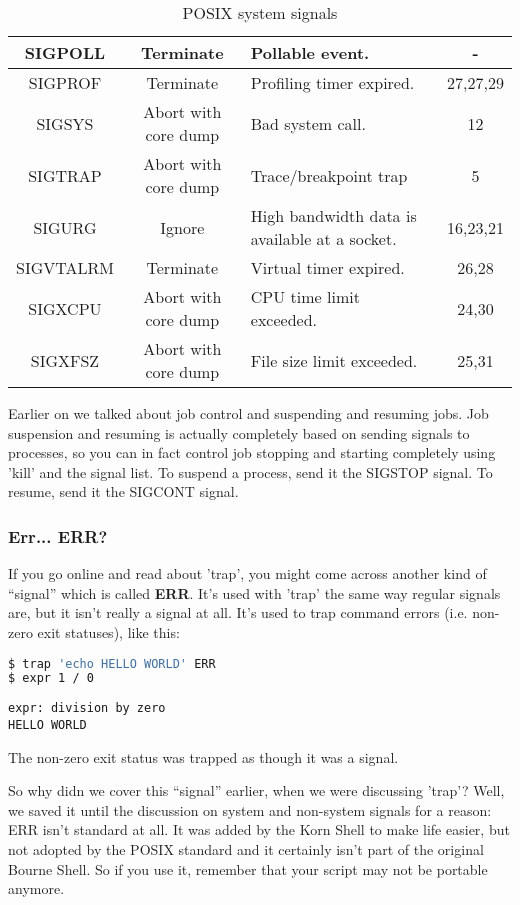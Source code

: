 \begin{table*}[H]
\begin{tabular}{|c|c|p{4cm}|c|}
		 SIGPOLL &  Terminate &  Pollable event. &  - \\ \hline
		 SIGPROF &  Terminate &  Profiling timer expired. &  27,27,29 \\ \hline
		 SIGSYS &  Abort with core dump &  Bad system call. &  12 \\ \hline
		 SIGTRAP &  Abort with core dump &  Trace/breakpoint trap &  5 \\ \hline
		 SIGURG &  Ignore &  High bandwidth data is available at a socket. &  16,23,21 \\ \hline
		 SIGVTALRM &  Terminate &  Virtual timer expired. &  26,28 \\ \hline
		 SIGXCPU &  Abort with core dump &  CPU time limit exceeded. &  24,30 \\ \hline
		 SIGXFSZ &  Abort with core dump &  File size limit exceeded. &  25,31 \\ \hline
	\end{tabular}
	\caption{POSIX system signals}
	\label{tab:posixsignal}
\end{table*}

Earlier on we talked about job control and suspending and resuming jobs. Job
suspension and resuming is actually completely based on sending signals to
processes, so you can in fact control job stopping and starting completely
using 'kill' and the signal list. To suspend a process, send it the SIGSTOP
signal. To resume, send it the SIGCONT signal.

\subsubsection{Err... ERR?}
If you go online and read about 'trap', you might come across another kind of
``signal'' which is called \textbf{ERR}. It's used with 'trap' the same way
regular signals are, but it isn't really a signal at all. It's used to trap
command errors (i.e. non-zero exit statuses), like this:

\lstset{basicstyle=\scriptsize, numbers=left, captionpos=b, tabsize=4}
\begin{lstlisting}[caption=Error trapping,language={bash},
breaklines=true,xleftmargin=15pt,label=lst:Error trapping]
$ trap 'echo HELLO WORLD' ERR
$ expr 1 / 0
\end{lstlisting}

\scriptsize
\begin{verbatim}
expr: division by zero
HELLO WORLD
\end{verbatim}
\normalsize
The non-zero exit status was trapped as though it was a signal.

So why didn we cover this ``signal'' earlier, when we were discussing
'trap'? Well, we saved it until
the discussion on system and non-system signals for a reason: ERR isn't
standard at all. It was added by the Korn Shell to make life easier, but not
adopted by the POSIX standard and it certainly isn't part of the original
Bourne Shell. So if you use it, remember that your script may not be portable
anymore.
